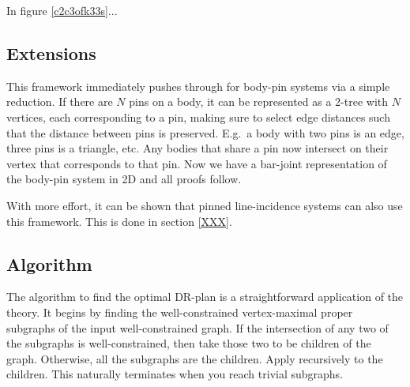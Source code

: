 \begin{example}
    In figure \ref{c2c3ofk33s}... 
\end{example}





\subsection{Extensions}
This framework immediately pushes through for body-pin systems via a simple reduction. If there are $N$ pins on a body, it can be represented as a 2-tree with $N$ vertices, each corresponding to a pin, making sure to select edge distances such that the distance between pins is preserved. E.g.\ a body with two pins is an edge, three pins is a triangle, etc. Any bodies that share a pin now intersect on their vertex that corresponds to that pin. Now we have a bar-joint representation of the body-pin system in 2D and all proofs follow.

With more effort, it can be shown that pinned line-incidence systems can also use this framework. This is done in section \ref{XXX}.



\subsection{Algorithm}
The algorithm to find the optimal DR-plan is a straightforward application of the theory. It begins by finding the well-constrained vertex-maximal proper subgraphs of the input well-constrained graph. If the intersection of any two of the subgraphs is well-constrained, then take those two to be children of the graph. Otherwise, all the subgraphs are the children. Apply recursively to the children. This naturally terminates when you reach trivial subgraphs.
